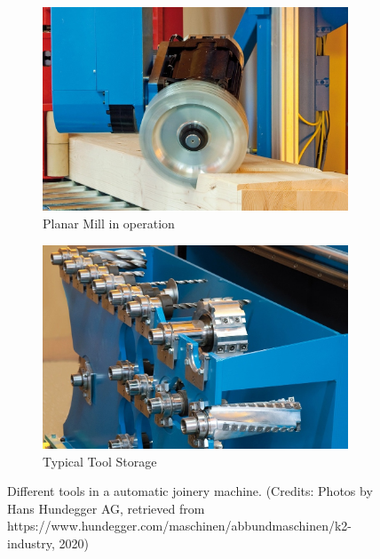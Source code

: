 \begin{figure}[!h]
    \centering
    \begin{subfigure}[b]{0.49\textwidth}
        \centering
        \includegraphics[width=\textwidth]{images/7a/img02.jpg}
        \caption{Planar Mill in operation}
    \end{subfigure}
    \hfill
    \begin{subfigure}[b]{0.49\textwidth}
        \centering
        \includegraphics[width=\textwidth]{images/7a/img03.jpg}
        \caption{Typical Tool Storage}
    \end{subfigure}
    \caption[Different tools in a automatic joinery machine]
    {Different tools in a automatic joinery machine.
    \footnotesize{(Credits: Photos by Hans Hundegger AG, retrieved from https://www.hundegger.com/maschinen/abbundmaschinen/k2-industry, 2020)}}
    \label{fig:tools-in-automatic-joinery-machine}
\end{figure}


